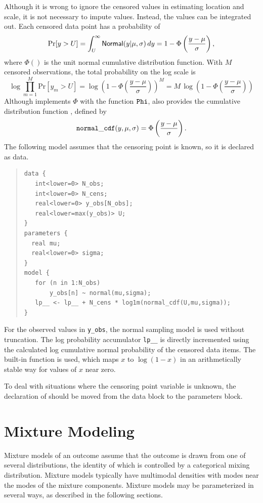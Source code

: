 Although it is wrong to ignore the censored values in estimating
location and scale, it is not necessary to impute values.  Instead,
the values can be integrated out.  Each censored data point has a
probability of
%
\[
\mbox{Pr}[y > U] 
= \int_U^{\infty} \mbox{\sf Normal}(y|\mu,\sigma) \, dy
= 1 - \Phi\left(\frac{y - \mu}{\sigma}\right),
\]
%
where $\Phi()$ is the unit normal cumulative distribution function.
With $M$ censored observations, the total probability on the log scale
is
\[
\log \prod_{m=1}^M \mbox{Pr}[y_m > U]
= \log \left( 1 - \Phi\left(\frac{y - \mu}{\sigma}\right)\right)^{M}
= M \, \log \left( 1 - \Phi\left(\frac{y - \mu}{\sigma}\right)\right)
\]
% 
Although \Stan implements $\Phi$ with the function ${\tt Phi}$, \Stan
also provides the cumulative distribution function ,
defined by
\[
{\tt normal\_cdf}(y,\mu,\sigma) = \Phi \left( \frac{y - \mu}{\sigma} \right).
\]
%
The following model assumes
that the censoring point is known, so it is declared as data.
%
\begin{quote}
\begin{Verbatim}
data {
   int<lower=0> N_obs;
   int<lower=0> N_cens;
   real<lower=0> y_obs[N_obs];
   real<lower=max(y_obs)> U;
}
parameters {
  real mu;
  real<lower=0> sigma;
}
model {
   for (n in 1:N_obs)
       y_obs[n] ~ normal(mu,sigma); 
   lp__ <- lp__ + N_cens * log1m(normal_cdf(U,mu,sigma));
}
\end{Verbatim}
\end{quote}
%
For the observed values in \Verb|y_obs|, the normal sampling model is
used without truncation.  The log probability accumulator
\Verb|lp__| is directly incremented using the calculated log
cumulative normal probability of the censored data items.  The
built-in function  is used, which maps $x$ to $\log (1 -
x)$ in an arithmetically stable way for values of $x$ near zero.

To deal with situations where the censoring point variable  is
unknown, the declaration of  should be moved from the data
block to the parameters block.



\chapter{Mixture Modeling}\label{mixture-modeling.chapter}

\noindent
Mixture models of an outcome assume that the outcome is drawn from one
of several distributions, the identity of which is controlled by a
categorical mixing distribution. Mixture models typically have
multimodal densities with modes near the modes of the mixture
components.  Mixture models may be parameterized in several ways,
as described in the following sections.


